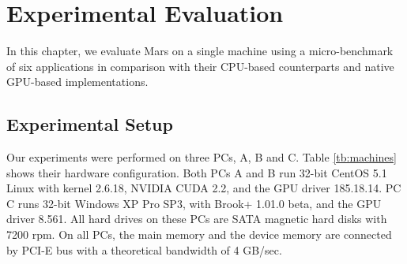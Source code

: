 \chapter{Experimental Evaluation}\label{sec-eval}
In this chapter, we evaluate Mars on a single machine using a micro-benchmark of six applications in comparison with their CPU-based counterparts and native GPU-based implementations.


\section{Experimental Setup}
Our experiments were performed on three PCs, A, B and
 C. Table \ref{tb:machines} shows their hardware configuration.
Both PCs A and B run 32-bit CentOS 5.1 Linux with kernel
2.6.18, NVIDIA CUDA 2.2, and the GPU driver 185.18.14. PC C runs
32-bit Windows XP Pro SP3, with Brook+ 1.01.0 beta, and the GPU
driver 8.561. All hard drives on these PCs are SATA magnetic hard
disks with 7200 rpm. On all PCs, the main memory and the device
memory are connected by PCI-E bus with a theoretical bandwidth of 4
GB/sec.

\doublerulesep 0.1pt
\begin{table}[htb]
  \centering
\end{table}



